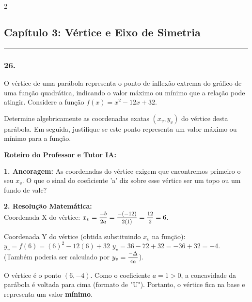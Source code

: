 \begin{multicols*}{2}
\par\vspace{\espacoQuestao}

\subsection*{Capítulo 3: Vértice e Eixo de Simetria}
\vspace{-0.2cm}\noindent\rule{\linewidth}{1.5pt} 
\par\vspace{\espacoPosTitulo}
\subsubsection*{26.} 
\begin{enunciadoLiteral}
O vértice de uma parábola representa o ponto de inflexão extrema do gráfico de uma função quadrática, indicando o valor máximo ou mínimo que a relação pode atingir. Considere a função $f(x) = x^2 - 12x + 32$.

Determine algebricamente as coordenadas exatas $(x_v, y_v)$ do vértice desta parábola. Em seguida, justifique se este ponto representa um valor máximo ou mínimo para a função.
\end{enunciadoLiteral}

\ifgabarito
    \begin{tcolorbox}[colback=CorTitUm!5, colframe=CorTitUm, boxrule=1pt, arc=4pt, left=6pt, right=6pt, top=6pt, bottom=6pt]
    \small\textbf{\textcolor{CorTitUm}{Roteiro do Professor e Tutor IA:}}\par\vspace{0.1cm}
    \color{CinzaEscuro}
    \textbf{1. Ancoragem:} As coordenadas do vértice exigem que encontremos primeiro o seu $x_v$. O que o sinal do coeficiente 'a' diz sobre esse vértice ser um topo ou um fundo de vale?\par\vspace{0.1cm}
    \textbf{2. Resolução Matemática:}\\
    Coordenada X do vértice:
    $x_v = \mfrac{-b}{2a} = \mfrac{-(-12)}{2(1)} = \mfrac{12}{2} = 6$.
    
    Coordenada Y do vértice (obtida substituindo $x_v$ na função):
    $y_v = f(6) = (6)^2 - 12(6) + 32$
    $y_v = 36 - 72 + 32 = -36 + 32 = -4$.
    (Também poderia ser calculado por $y_v = \mfrac{-\Delta}{4a}$).
    
    O vértice é o ponto $(6, -4)$. Como o coeficiente $a = 1 > 0$, a concavidade da parábola é voltada para cima (formato de "U"). Portanto, o vértice fica na base e representa um valor \textbf{mínimo}.
    \end{tcolorbox}
    \vspace{0.15cm}
    

\end{multicols*}
